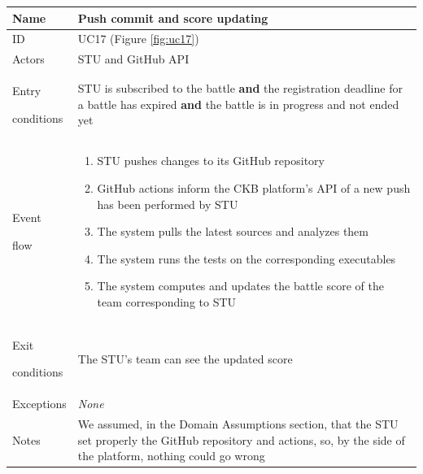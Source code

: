 \begin{center}
    \def\arraystretch{1.5}
    \begin{tabular}{| m{2cm} | m{10cm}|}
        \hline
        Name                  & Push commit and score updating                                                                                                                                          \\ \hline
        ID                    & UC17 (Figure \ref{fig:uc17})                                                                                                                                            \\ \hline
        Actors                & STU and GitHub API                                                                                                                                                      \\ \hline
        Entry \par conditions & STU is subscribed to the battle \textbf{and} the registration deadline for a battle has expired \textbf{and} the battle is in progress and not ended yet                \\ \hline
        Event \par flow       & \begin{enumerate}
                                    \item STU pushes changes to its GitHub repository
                                    \item GitHub actions inform the CKB platform's API of a new push has been performed by STU
                                    \item The system pulls the latest sources and analyzes them
                                    \item The system runs the tests on the corresponding executables
                                    \item The system computes and updates the battle score of the team corresponding to STU
                                \end{enumerate}                                                                                                                                                         \\ \hline
        Exit \par conditions  & The STU's team can see the updated score                                                                                                                                \\ \hline
        Exceptions            & \textit{None}                                                                                                                                                           \\ \hline
        Notes                 & We assumed, in the Domain Assumptions section, that the STU set properly the GitHub repository and actions, so, by the side of the platform, nothing could go wrong     \\ \hline
    \end{tabular}
\end{center}

